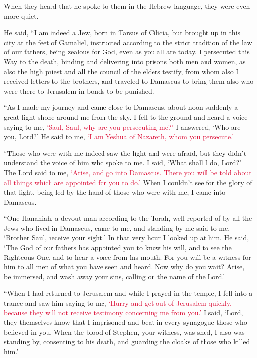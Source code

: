 \quad\quad \myverse{}When they heard that he spoke to them in the Hebrew language,
they were even more quiet.

He said,
\myverse{}“I am indeed a Jew, born in Tarsus of Cilicia, but brought up in this city
at the feet of Gamaliel, instructed according to the strict tradition of the law of our fathers, being
zealous for God, even as you all are today.
\myverse{}I persecuted this Way to the death, binding and delivering into prisons both
men and women,
\myverse{}as also the high priest and all the council of the elders testify, from whom
also I received letters to the brothers, and traveled to Damascus to bring them also who were there to
Jerusalem in bonds to be punished.

\myverse{}“As I made my journey and came close to Damascus, about noon suddenly
a great light shone around me from the sky.
\myverse{}I fell to the ground and heard a voice saying to me,
\textcolor{crimson}{‘Saul, Saul, why are you persecuting me?’}
\myverse{}I answered, ‘Who are you, Lord?’ He said to me,
\textcolor{crimson}{‘I am Yeshua of Nazareth, whom you persecute.’}

\myverse{}“Those who were with me indeed saw the light and were afraid,
but they didn’t understand the voice of him who spoke to me.
\myverse{}I said, ‘What shall I do, Lord?’ The Lord said to me,
\textcolor{crimson}{‘Arise, and go into Damascus. There you will be told about all things which are appointed for you
	to do.’}
\myverse{}When I couldn’t see for the glory of that light, being led by the hand of
those who were with me, I came into Damascus.

\myverse{}“One Hananiah, a devout man according to the Torah, well reported
of by all the Jews who lived in Damascus,
\myverse{}came to me, and standing by me said to me, ‘Brother Saul, receive your sight!’
In that very hour I looked up at him.
\myverse{}He said, ‘The God of our fathers has appointed you to know his will, and
to see the Righteous One, and to hear a voice from his mouth.
\myverse{}For you will be a witness for him to all men of what you have seen and heard.
\myverse{}Now why do you wait? Arise, be immersed, and wash away your sins, calling
on the name of the Lord.’

\myverse{}“When I had returned to Jerusalem and while I prayed in the
temple, I fell into a trance
\myverse{}and saw him saying to me,
\textcolor{crimson}{‘Hurry and get out of Jerusalem quickly, because they will not receive testimony concerning me from
	you.’}
\myverse{}I said, ‘Lord, they themselves know that I imprisoned and beat in every synagogue
those who believed in you.
\myverse{}When the blood of Stephen, your witness, was shed, I also was standing by,
consenting to his death, and guarding the cloaks of those who killed him.’

